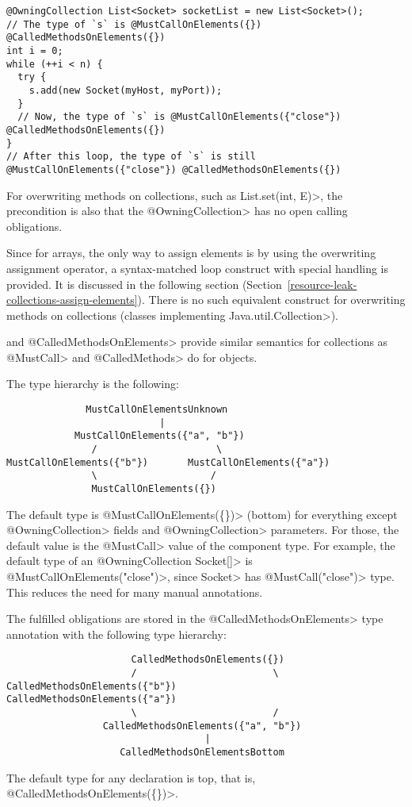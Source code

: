 \begin{verbatim}
@OwningCollection List<Socket> socketList = new List<Socket>();
// The type of `s` is @MustCallOnElements({}) @CalledMethodsOnElements({})
int i = 0;
while (++i < n) {
  try {
    s.add(new Socket(myHost, myPort));
  }
  // Now, the type of `s` is @MustCallOnElements({"close"}) @CalledMethodsOnElements({})
}
// After this loop, the type of `s` is still @MustCallOnElements({"close"}) @CalledMethodsOnElements({})
\end{verbatim}

For overwriting methods on collections, such as \<List.set(int, E)>, the precondition is also that the \<@OwningCollection> has no open calling obligations.

Since for arrays, the only way to assign elements is by using the overwriting assignment operator, a syntax-matched loop construct with special handling is provided. It is discussed in the following section (Section~\ref{resource-leak-collections-assign-elements}). There is no such equivalent construct for overwriting methods on collections (classes implementing \<Java.util.Collection>).

\MustCallOnElements and \<@CalledMethodsOnElements> provide similar semantics for collections as \<@MustCall> and \<@CalledMethods> do for objects.

The type hierarchy is the following:

\begin{verbatim}
              MustCallOnElementsUnknown
                           |
            MustCallOnElements({"a", "b"})
               /                     \
MustCallOnElements({"b"})       MustCallOnElements({"a"})
               \                    /
               MustCallOnElements({})
\end{verbatim}

The default type is \<@MustCallOnElements(\{\})> (bottom) for everything except
\<@OwningCollection> fields and \<@OwningCollection> parameters. For those, the
default \MustCallOnElements value is the \<@MustCall> value of the component
type. For example, the default type of an \<@OwningCollection Socket[]> is
\<@MustCallOnElements({"close"})>, since \<Socket> has \<@MustCall("close")>
type. This reduces the need for many manual annotations.

The fulfilled obligations are stored in the \<@CalledMethodsOnElements> type annotation with the following type hierarchy:
\begin{verbatim}
                      CalledMethodsOnElements({})
                      /                        \
CalledMethodsOnElements({"b"})           CalledMethodsOnElements({"a"})
                      \                        /
                 CalledMethodsOnElements({"a", "b"})
                                   |
                    CalledMethodsOnElementsBottom
\end{verbatim}
The default type for any declaration is top, that is, \<@CalledMethodsOnElements(\{\})>.


